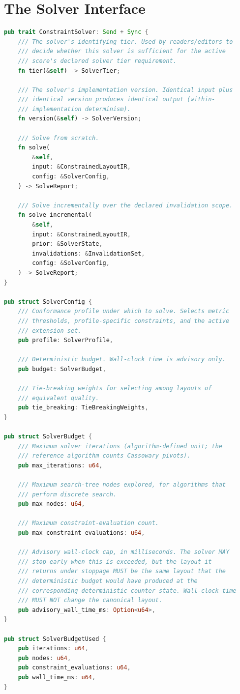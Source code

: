 \documentclass[11pt,letterpaper]{report}
\newcounter{requirement}[chapter]
\begin{document}
\section{The Solver Interface}
\label{sec:solver:interface}

\begin{lstlisting}[language=Rust]
pub trait ConstraintSolver: Send + Sync {
    /// The solver's identifying tier. Used by readers/editors to
    /// decide whether this solver is sufficient for the active
    /// score's declared solver tier requirement.
    fn tier(&self) -> SolverTier;

    /// The solver's implementation version. Identical input plus
    /// identical version produces identical output (within-
    /// implementation determinism).
    fn version(&self) -> SolverVersion;

    /// Solve from scratch.
    fn solve(
        &self,
        input: &ConstrainedLayoutIR,
        config: &SolverConfig,
    ) -> SolveReport;

    /// Solve incrementally over the declared invalidation scope.
    fn solve_incremental(
        &self,
        input: &ConstrainedLayoutIR,
        prior: &SolverState,
        invalidations: &InvalidationSet,
        config: &SolverConfig,
    ) -> SolveReport;
}

pub struct SolverConfig {
    /// Conformance profile under which to solve. Selects metric
    /// thresholds, profile-specific constraints, and the active
    /// extension set.
    pub profile: SolverProfile,

    /// Deterministic budget. Wall-clock time is advisory only.
    pub budget: SolverBudget,

    /// Tie-breaking weights for selecting among layouts of
    /// equivalent quality.
    pub tie_breaking: TieBreakingWeights,
}

pub struct SolverBudget {
    /// Maximum solver iterations (algorithm-defined unit; the
    /// reference algorithm counts Cassowary pivots).
    pub max_iterations: u64,

    /// Maximum search-tree nodes explored, for algorithms that
    /// perform discrete search.
    pub max_nodes: u64,

    /// Maximum constraint-evaluation count.
    pub max_constraint_evaluations: u64,

    /// Advisory wall-clock cap, in milliseconds. The solver MAY
    /// stop early when this is exceeded, but the layout it
    /// returns under stoppage MUST be the same layout that the
    /// deterministic budget would have produced at the
    /// corresponding deterministic counter state. Wall-clock time
    /// MUST NOT change the canonical layout.
    pub advisory_wall_time_ms: Option<u64>,
}

pub struct SolverBudgetUsed {
    pub iterations: u64,
    pub nodes: u64,
    pub constraint_evaluations: u64,
    pub wall_time_ms: u64,
}
\end{lstlisting}
\end{document}
